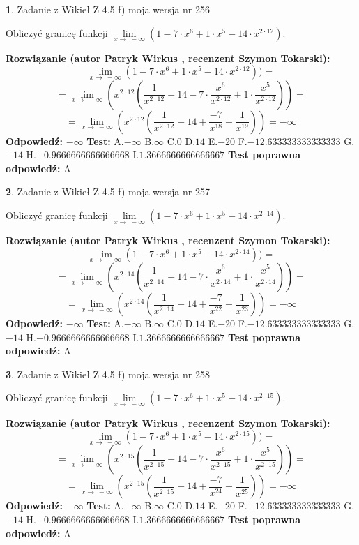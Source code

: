 \documentclass[12pt, a4paper]{article}
\theoremstyle{definition} %
\newtheorem{zad}{}
\newcommand{\zadStart}[1]{\begin{zad}#1\newline}
\newcommand{\zadStop}{\end{zad}}
\newcommand{\rozwStart}[2]{\noindent \textbf{Rozwiązanie (autor #1 , recenzent #2): }\newline}
\newcommand{\rozwStop}{\newline}
\newcommand{\odpStart}{\noindent \textbf{Odpowiedź:}\newline}
\newcommand{\odpStop}{\newline}
\newcommand{\testStart}{\noindent \textbf{Test:}\newline}
\newcommand{\testStop}{\newline}
\newcommand{\kluczStart}{\noindent \textbf{Test poprawna odpowiedź:}\newline}
\newcommand{\kluczStop}{\newline}
\begin{document}
\zadStart{Zadanie z Wikieł Z 4.5 f) moja wersja nr 256}


Obliczyć granicę funkcji  $\lim\limits_{x\to\ -\infty}(1 - 7 \cdot x^{6}+1 \cdot x^{5}- 14 \cdot x^{2\cdot12})$.
\zadStop
\rozwStart{Patryk Wirkus}{Szymon Tokarski}
$$\lim\limits_{x\to\ -\infty}(1 - 7 \cdot x^{6}+1 \cdot x^{5}- 14 \cdot x^{2\cdot12}))=$$
$$=\lim\limits_{x\to\ -\infty}(x^{2\cdot12}(\frac{1}{x^{2\cdot12}}-14 -7 \cdot \frac{x^{6}}{x^{2\cdot12}}+1 \cdot \frac{x^{5}}{x^{2\cdot12}}))=$$
$$=\lim\limits_{x\to\ -\infty}(x^{2\cdot12}(\frac{1}{x^{2\cdot12}}-14 + \frac{-7}{x^{18}}+ \frac{1}{x^{19}}))=-\infty$$
\rozwStop
\odpStart
$-\infty$
\odpStop
\testStart
A.$-\infty$ B.$\infty$ C.$0$ D.$14$ E.$-20$
F.$-12.633333333333333$ G.$-14$
H.$-0.9666666666666668$
I.$1.3666666666666667$
\testStop
\kluczStart
A
\kluczStop



\zadStart{Zadanie z Wikieł Z 4.5 f) moja wersja nr 257}


Obliczyć granicę funkcji  $\lim\limits_{x\to\ -\infty}(1 - 7 \cdot x^{6}+1 \cdot x^{5}- 14 \cdot x^{2\cdot14})$.
\zadStop
\rozwStart{Patryk Wirkus}{Szymon Tokarski}
$$\lim\limits_{x\to\ -\infty}(1 - 7 \cdot x^{6}+1 \cdot x^{5}- 14 \cdot x^{2\cdot14}))=$$
$$=\lim\limits_{x\to\ -\infty}(x^{2\cdot14}(\frac{1}{x^{2\cdot14}}-14 -7 \cdot \frac{x^{6}}{x^{2\cdot14}}+1 \cdot \frac{x^{5}}{x^{2\cdot14}}))=$$
$$=\lim\limits_{x\to\ -\infty}(x^{2\cdot14}(\frac{1}{x^{2\cdot14}}-14 + \frac{-7}{x^{22}}+ \frac{1}{x^{23}}))=-\infty$$
\rozwStop
\odpStart
$-\infty$
\odpStop
\testStart
A.$-\infty$ B.$\infty$ C.$0$ D.$14$ E.$-20$
F.$-12.633333333333333$ G.$-14$
H.$-0.9666666666666668$
I.$1.3666666666666667$
\testStop
\kluczStart
A
\kluczStop



\zadStart{Zadanie z Wikieł Z 4.5 f) moja wersja nr 258}


Obliczyć granicę funkcji  $\lim\limits_{x\to\ -\infty}(1 - 7 \cdot x^{6}+1 \cdot x^{5}- 14 \cdot x^{2\cdot15})$.
\zadStop
\rozwStart{Patryk Wirkus}{Szymon Tokarski}
$$\lim\limits_{x\to\ -\infty}(1 - 7 \cdot x^{6}+1 \cdot x^{5}- 14 \cdot x^{2\cdot15}))=$$
$$=\lim\limits_{x\to\ -\infty}(x^{2\cdot15}(\frac{1}{x^{2\cdot15}}-14 -7 \cdot \frac{x^{6}}{x^{2\cdot15}}+1 \cdot \frac{x^{5}}{x^{2\cdot15}}))=$$
$$=\lim\limits_{x\to\ -\infty}(x^{2\cdot15}(\frac{1}{x^{2\cdot15}}-14 + \frac{-7}{x^{24}}+ \frac{1}{x^{25}}))=-\infty$$
\rozwStop
\odpStart
$-\infty$
\odpStop
\testStart
A.$-\infty$ B.$\infty$ C.$0$ D.$14$ E.$-20$
F.$-12.633333333333333$ G.$-14$
H.$-0.9666666666666668$
I.$1.3666666666666667$
\testStop
\kluczStart
A
\kluczStop
\end{document}
